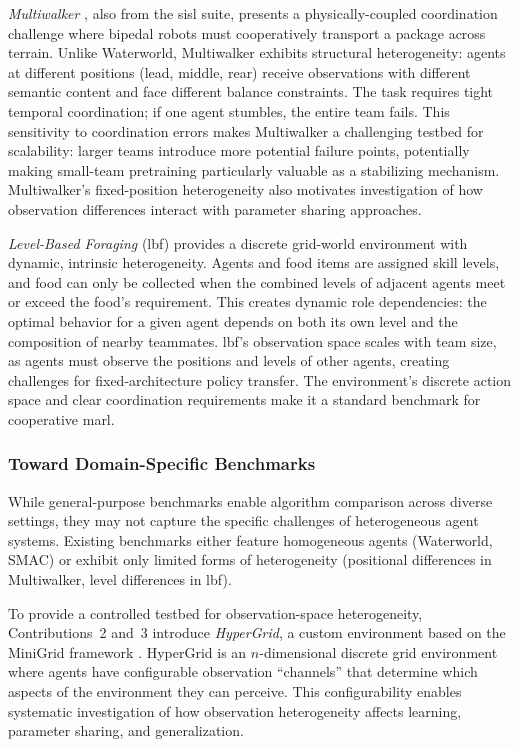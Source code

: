 \textit{Multiwalker} \cite{gupta2017}, also from the \gls{sisl} suite, 
presents a physically-coupled coordination challenge where bipedal robots 
must cooperatively transport a package across terrain. Unlike Waterworld, 
Multiwalker exhibits structural heterogeneity: agents at different 
positions (lead, middle, rear) receive observations with different 
semantic content and face different balance constraints. 
The task requires tight temporal coordination; if one agent stumbles, 
the entire team fails. This sensitivity to coordination errors makes 
Multiwalker a challenging testbed for scalability: larger teams 
introduce more potential failure points, potentially making small-team 
pretraining particularly valuable as a stabilizing mechanism. 
Multiwalker's fixed-position heterogeneity also motivates investigation 
of how observation differences interact with parameter sharing approaches.

\textit{Level-Based Foraging} (\gls{lbf}) \cite{papoudakis2021} provides 
a discrete grid-world environment with dynamic, intrinsic heterogeneity. 
Agents and food items are assigned skill levels, and food can only be 
collected when the combined levels of adjacent agents meet or exceed 
the food's requirement. This creates dynamic role dependencies: 
the optimal behavior for a given agent depends on both its own level 
and the composition of nearby teammates. \Gls{lbf}'s observation space 
scales with team size, as agents must observe the positions and levels 
of other agents, creating challenges for fixed-architecture policy transfer. 
The environment's discrete action space and clear coordination requirements 
make it a standard benchmark for cooperative \gls{marl}.

\subsubsection{Toward Domain-Specific Benchmarks}

While general-purpose benchmarks enable algorithm comparison across diverse settings, 
they may not capture the specific challenges of heterogeneous agent systems. 
Existing benchmarks either feature homogeneous agents (Waterworld, SMAC) 
or exhibit only limited forms of heterogeneity (positional differences 
in Multiwalker, level differences in \gls{lbf}).

To provide a controlled testbed for observation-space heterogeneity, 
Contributions~2 and~3 introduce \textit{HyperGrid}, a custom environment 
based on the MiniGrid framework \cite{chevalier-boisvert2023}. 
HyperGrid is an \(n\)-dimensional discrete grid environment where 
agents have configurable observation ``channels'' that determine 
which aspects of the environment they can perceive. 
This configurability enables systematic investigation of how 
observation heterogeneity affects learning, parameter sharing, 
and generalization.

